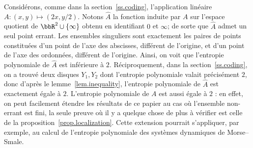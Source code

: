 \begin{exam*}
Considérons, comme dans la section~\ref{ss.coding}, {l'application linéaire} $A : (x,y) \mapsto (2x, y/2)$. Notons $\hat A$ la fonction induite par $A$ sur l'espace quotient de $\bbR^2 \cup\{\infty\}$ obtenu en identifiant $0$ et $\infty$; de sorte que $\hat A$ admet un seul point errant. Les ensembles singuliers sont exactement les paires de points constituées d'un point de l'axe des abscisses, différent de l'origine, et d'un point de l'axe des ordonnées, différent de l'origine. Ainsi, on voit que l'entropie polynomiale de $\hat A$ est inférieure à $2$. Réciproquement, dans la section~\ref{ss.coding}, on a trouvé deux disques $Y_1, Y_2$ dont l'entropie polynomiale valait précisément $2$, donc d'après le lemme~\ref{lem.inequality}, l'entropie polynomiale de $\hat A$ est exactement égale à $2$. L'entropie polynomiale de $A$ est aussi égale à $2$ : en effet, on peut facilement étendre les résultats de ce papier au cas où l'ensemble non-errant est fini, la seule preuve où il y a quelque chose de plus à vérifier est celle de la proposition~\ref{prop.localization}. Cette extension pourrait s'appliquer, par exemple, au calcul de l'entropie polynomiale des systèmes dynamiques de Morse--Smale.
\end{exam*}

